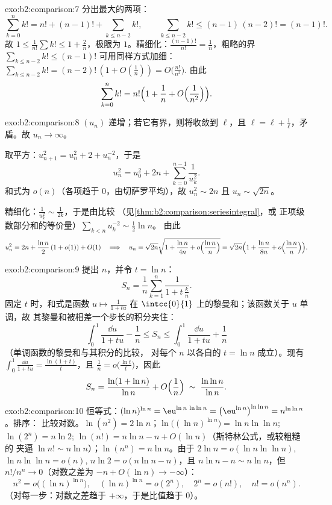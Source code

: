 \begin{solution}{exo:b2:comparison:7}
分出最大的两项：
\[
\sum_{k=0}^{n} k! = n! + (n-1)! + \sum_{k \leq n-2} k! ,
\qquad
\sum_{k\leq n-2} k! \leq (n-1)\,(n-2)! = (n-1)! .
\]
故 $1 \leq \frac{1}{n!}\sum k! \leq 1 + \frac{2}{n}$，极限为
$1$。精细化：$\frac{(n-1)!}{n!} = \frac1n$，粗略的界
$\sum_{k \leq n-2}k! \leq (n-1)!$ 可用同样方式加细：
$\sum_{k\leq n-2} k! = (n-2)!\,(1 + O(\frac1n)) = O\bigl(\frac{n!}{n^2}\bigr)$.
由此
\[
\sum_{k=0}^{n} k! = n!\Bigl(1 + \frac1n + O\Bigl(\frac{1}{n^2}\Bigr)\Bigr).
\]
\end{solution}

\begin{solution}{exo:b2:comparison:8}
$(u_n)$ 递增；若它有界，则将收敛到 $\ell$，且
$\ell = \ell + \frac1\ell$，矛盾。故 $u_n \to \infty$。

取平方：$u_{n+1}^2 = u_n^2 + 2 + u_n^{-2}$，于是
\[
u_n^2 = u_0^2 + 2n + \sum_{k=0}^{n-1} \frac{1}{u_k^2} .
\]
和式为 $o(n)$（各项趋于 $0$，由切萨罗平均），故 $u_n^2 \sim 2n$
且 $u_n \sim \sqrt{2n}$。

精细化：$\frac{1}{u_k^2} \sim \frac{1}{2k}$，于是由比较
（见\cref{thm:b2:comparison:seriesintegral}，或
正项级数部分和的等价量）$\sum_{k<n} u_k^{-2} \sim \frac12 \ln n$。
由此
\[
u_n^2 = 2n + \frac{\ln n}{2}\,(1 + o(1)) + O(1)
\quad\Longrightarrow\quad
u_n = \sqrt{2n}\sqrt{1 + \frac{\ln n}{4n} + o\Bigl(\frac{\ln
n}{n}\Bigr)}
= \sqrt{2n}\Bigl(1 + \frac{\ln n}{8n} + o\Bigl(\frac{\ln
n}{n}\Bigr)\Bigr).
\]
\end{solution}

\begin{solution}{exo:b2:comparison:9}
提出 $n$，并令 $t = \ln n$：
\[
S_n = \frac1n \sum_{k=1}^{n} \frac{1}{1 + t\,\frac kn} .
\]
固定 $t$ 时，和式是函数 $u \mapsto \frac{1}{1 +
tu}$ 在 $\intcc{0}{1}$ 上的黎曼和；该函数关于 $u$ 单调，故
其黎曼和被相差一个步长的积分夹住：
\[
\int_0^1 \frac{\dd u}{1 + tu} - \frac1n
\leq S_n \leq \int_0^1 \frac{\dd u}{1 + tu} + \frac1n
\]
（单调函数的黎曼和与其积分的比较，
对每个 $n$ 以各自的 $t = \ln n$ 成立）。现有
$\int_0^1 \frac{\dd u}{1 + tu} = \frac{\ln(1 + t)}{t}$，且
$\frac1n = o\bigl(\frac{\ln t}{t}\bigr)$，因此
\[
S_n = \frac{\ln(1 + \ln n)}{\ln n} + O\Bigl(\frac 1n\Bigr)
\;\sim\; \frac{\ln\ln n}{\ln n} .
\]
\end{solution}

\begin{solution}{exo:b2:comparison:10}
恒等式：$(\ln n)^{\ln n} = \eu^{\ln n\,\ln\ln n} =
\bigl(\eu^{\ln n}\bigr)^{\ln\ln n} = n^{\ln\ln n}$。排序：
比较对数。$\ln(n^2) = 2\ln n$；$\ln\bigl((\ln
n)^{\ln n}\bigr) = \ln n\ln\ln n$; $\ln(2^n) = n\ln2$;
$\ln(n!) = n\ln n - n + O(\ln n)$（斯特林公式，或较粗糙的
夹逼 $\ln n! \sim n\ln n$）；$\ln(n^n) = n\ln n$。由于
$2\ln n = o(\ln n\ln\ln n)$, $\ln n\ln\ln n = o(n)$, $n\ln 2 =
o(n\ln n - n)$，且 $n \ln n - n \sim n\ln n$，但 $n! / n^n \to
0$（对数之差为 $-n + O(\ln n) \to -\infty$）：
\[
n^2 = o\bigl((\ln n)^{\ln n}\bigr),\quad
(\ln n)^{\ln n} = o(2^n),\quad
2^n = o(n!),\quad
n! = o(n^n).
\]
（对每一步：对数之差趋于
$+\infty$，于是比值趋于 $0$）。
\end{solution}

